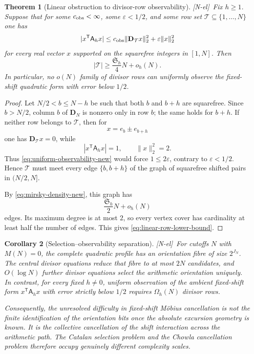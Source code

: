\documentclass[11pt]{amsart}
\numberwithin{equation}{section}
\theoremstyle{plain}
\newtheorem{theorem}{Theorem}[section]
\newtheorem{corollary}[theorem]{Corollary}
\theoremstyle{definition}
\theoremstyle{remark}
\newcommand{\tagNE}{\textup{[N-el]}}
\begin{document}
\begin{theorem}[Linear obstruction to divisor-row observability]
\label{thm:linear-observability-obstruction}
\tagNE\ Fix $h\ge1$.  Suppose that for some $c_{\rm obs}<\infty$, some $\varepsilon<1/2$, and some row set $\mathcal T\subseteq\{1,\dots,N\}$ one has
\begin{equation}
|x^{\mathsf T}\mathsf A_hx|
\le
c_{\rm obs}\|\mathbf D_\mathcal T x\|_2^2
+
\varepsilon\|x\|_2^2
\label{eq:uniform-observability-new}
\end{equation}
for every real vector $x$ supported on the squarefree integers in $[1,N]$.  Then
\begin{equation}
|\mathcal T|
\ge
\frac{\mathfrak S_h}{4}N+o_h(N).
\label{eq:linear-row-lower-bound}
\end{equation}
In particular, no $o(N)$ family of divisor rows can uniformly observe the fixed-shift quadratic form with error below $1/2$.
\end{theorem}

\begin{proof}
Let $N/2<b\le N-h$ be such that both $b$ and $b+h$ are squarefree.  Since $b>N/2$, column $b$ of $\mathbf D_N$ is nonzero only in row $b$; the same holds for $b+h$.  If neither row belongs to $\mathcal T$, then for
\[
x=e_b\pm e_{b+h}
\]
one has $\mathbf D_\mathcal T x=0$, while
\[
|x^{\mathsf T}\mathsf A_hx|=1,
\qquad
\|x\|_2^2=2.
\]
Thus \eqref{eq:uniform-observability-new} would force $1\le2\varepsilon$, contrary to $\varepsilon<1/2$.  Hence $\mathcal T$ must meet every edge $\{b,b+h\}$ of the graph of squarefree shifted pairs in $(N/2,N]$.

By \eqref{eq:mirsky-density-new}, this graph has
\[
\frac{\mathfrak S_h}{2}N+o_h(N)
\]
edges.  Its maximum degree is at most $2$, so every vertex cover has cardinality at least half the number of edges.  This gives \eqref{eq:linear-row-lower-bound}.
\end{proof}

\begin{corollary}[Selection--observability separation]
\label{cor:selection-observability-separation}
\tagNE\ For cutoffs $N$ with $M(N)=0$, the complete quadratic profile has an orientation fibre of size $2^{J_N}$.  The central divisor equations reduce that fibre to at most $2N$ candidates, and $O(\log N)$ further divisor equations select the arithmetic orientation uniquely.  In contrast, for every fixed $h\ne0$, uniform observation of the ambient fixed-shift form $x^{\mathsf T}\mathsf A_hx$ with error strictly below $1/2$ requires $\Omega_h(N)$ divisor rows.

Consequently, the unresolved difficulty in fixed-shift M\"obius cancellation is not the finite identification of the orientation bits once the absolute excursion geometry is known.  It is the collective cancellation of the shift interaction across the arithmetic path.  The Catalan selection problem and the Chowla cancellation problem therefore occupy genuinely different complexity scales.
\end{corollary}
\end{document}
